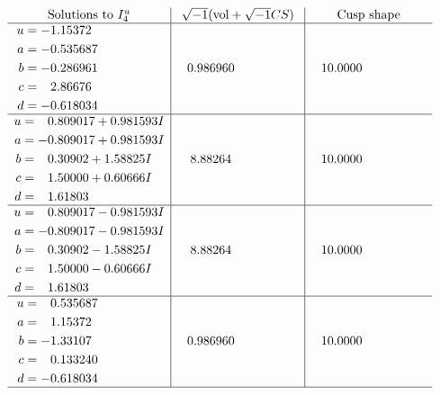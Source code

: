 \documentclass[1p]{elsarticle_modified}
\theoremstyle{definition}
\newcommand{\I}{\sqrt{-1}}
\begin{document}
$$\begin{array}{c|c|c}  
\text{Solutions to }I^u_{4}& \I (\text{vol} + \sqrt{-1}CS) & \text{Cusp shape}\\
 \hline 
\begin{aligned}
u &= -1.15372\phantom{ +0.000000I} \\
a &= -0.535687\phantom{ +0.000000I} \\
b &= -0.286961\phantom{ +0.000000I} \\
c &= \phantom{-}2.86676\phantom{ +0.000000I} \\
d &= -0.618034\phantom{ +0.000000I}\end{aligned}
 & \phantom{-}0.986960\phantom{ +0.000000I} & \phantom{-}10.0000\phantom{ +0.000000I} \\ \hline\begin{aligned}
u &= \phantom{-}0.809017 + 0.981593 I \\
a &= -0.809017 + 0.981593 I \\
b &= \phantom{-}0.30902 + 1.58825 I \\
c &= \phantom{-}1.50000 + 0.60666 I \\
d &= \phantom{-}1.61803\phantom{ +0.000000I}\end{aligned}
 & \phantom{-}8.88264\phantom{ +0.000000I} & \phantom{-}10.0000\phantom{ +0.000000I} \\ \hline\begin{aligned}
u &= \phantom{-}0.809017 - 0.981593 I \\
a &= -0.809017 - 0.981593 I \\
b &= \phantom{-}0.30902 - 1.58825 I \\
c &= \phantom{-}1.50000 - 0.60666 I \\
d &= \phantom{-}1.61803\phantom{ +0.000000I}\end{aligned}
 & \phantom{-}8.88264\phantom{ +0.000000I} & \phantom{-}10.0000\phantom{ +0.000000I} \\ \hline\begin{aligned}
u &= \phantom{-}0.535687\phantom{ +0.000000I} \\
a &= \phantom{-}1.15372\phantom{ +0.000000I} \\
b &= -1.33107\phantom{ +0.000000I} \\
c &= \phantom{-}0.133240\phantom{ +0.000000I} \\
d &= -0.618034\phantom{ +0.000000I}\end{aligned}
 & \phantom{-}0.986960\phantom{ +0.000000I} & \phantom{-}10.0000\phantom{ +0.000000I}\\
 \hline 
 \end{array}$$\newpage\newpage\renewcommand{\arraystretch}{1}
\end{document}
